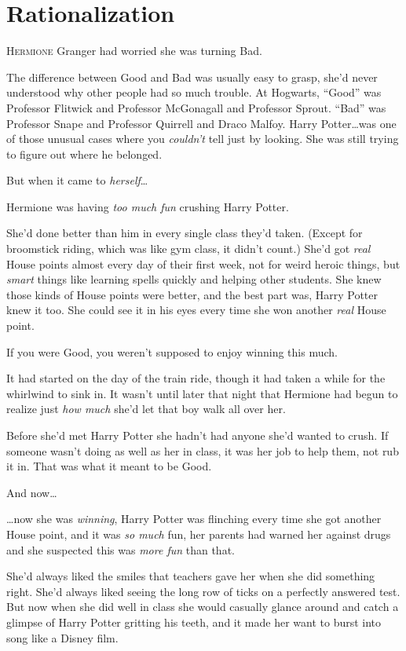 \chapter{Rationalization}

\lettrine{H}{ermione} Granger had worried she was turning Bad.

The difference between Good and Bad was usually easy to grasp, she’d never understood why other people had so much trouble. At Hogwarts, “Good” was Professor Flitwick and Professor McGonagall and Professor Sprout. “Bad” was Professor Snape and Professor Quirrell and Draco Malfoy. Harry Potter…was one of those unusual cases where you \emph{couldn’t} tell just by looking. She was still trying to figure out where he belonged.

But when it came to \emph{herself}…

Hermione was having \emph{too much fun} crushing Harry Potter.

She’d done better than him in every single class they’d taken. (Except for broomstick riding, which was like gym class, it didn’t count.) She’d got \emph{real} House points almost every day of their first week, not for weird heroic things, but \emph{smart} things like learning spells quickly and helping other students. She knew those kinds of House points were better, and the best part was, Harry Potter knew it too. She could see it in his eyes every time she won another \emph{real} House point.

If you were Good, you weren’t supposed to enjoy winning this much.

It had started on the day of the train ride, though it had taken a while for the whirlwind to sink in. It wasn’t until later that night that Hermione had begun to realize just \emph{how much} she’d let that boy walk all over her.

Before she’d met Harry Potter she hadn’t had anyone she’d wanted to crush. If someone wasn’t doing as well as her in class, it was her job to help them, not rub it in. That was what it meant to be Good.

And now…

…now she was \emph{winning}, Harry Potter was flinching every time she got another House point, and it was \emph{so much} fun, her parents had warned her against drugs and she suspected this was \emph{more fun} than that.

She’d always liked the smiles that teachers gave her when she did something right. She’d always liked seeing the long row of ticks on a perfectly answered test. But now when she did well in class she would casually glance around and catch a glimpse of Harry Potter gritting his teeth, and it made her want to burst into song like a Disney film.

